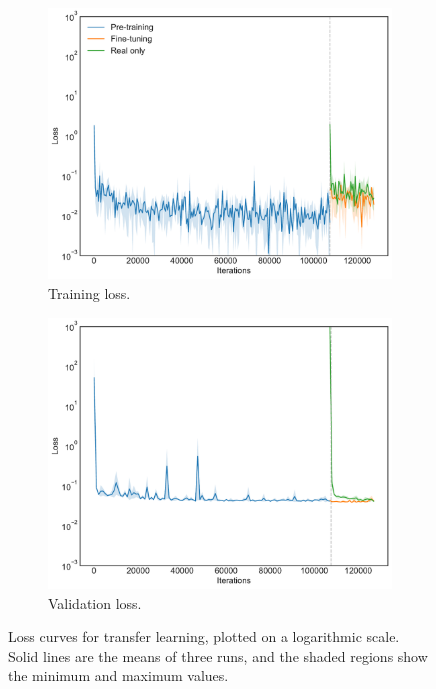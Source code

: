 \begin{figure}[h]
    \centering
    \begin{subfigure}{0.45\textwidth}
        \centering
        \includegraphics[width=\linewidth]{evaluation/figs/segmentation_transfer_training_loss.pdf}
        \caption{Training loss.}
        \label{fig:segmentation_transfer_loss_training}
    \end{subfigure}
    \begin{subfigure}{0.45\textwidth}
        \centering
        \includegraphics[width=\linewidth]{evaluation/figs/segmentation_transfer_validation_loss.pdf}
        \caption{Validation loss.}
        \label{fig:segmentation_transfer_loss_validation}
    \end{subfigure}
    \caption{Loss curves for transfer learning, plotted on a logarithmic scale. Solid lines are the means of three runs, and the shaded regions show the minimum and maximum values.}
    \label{fig:segmentation_transfer_loss}
\end{figure}